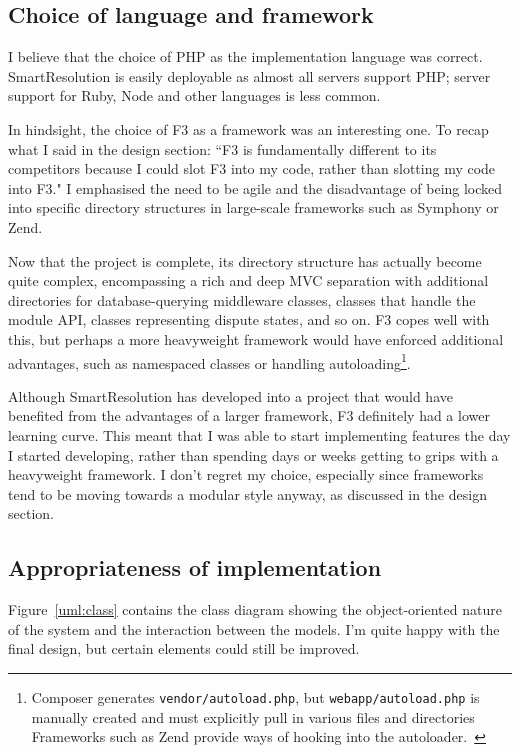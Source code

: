\subsection{Choice of language and framework}

I believe that the choice of PHP as the implementation language was correct. SmartResolution is easily deployable as almost all servers support PHP; server support for Ruby, Node and other languages is less common.

In hindsight, the choice of F3 as a framework was an interesting one. To recap what I said in the design section: ``F3 is fundamentally different to its competitors because I could slot F3 into my code, rather than slotting my code into F3." I emphasised the need to be agile and the disadvantage of being locked into specific directory structures in large-scale frameworks such as Symphony or Zend.

Now that the project is complete, its directory structure has actually become quite complex, encompassing a rich and deep MVC separation with additional directories for database-querying middleware classes, classes that handle the module API, classes representing dispute states, and so on. F3 copes well with this, but perhaps a more heavyweight framework would have enforced additional advantages, such as namespaced classes or handling autoloading\footnote{Composer generates \lstinline{vendor/autoload.php}, but \lstinline{webapp/autoload.php} is manually created and must explicitly pull in various files and directories Frameworks such as Zend provide ways of hooking into the autoloader.~\cite{zend:autoload}}.

Although SmartResolution has developed into a project that would have benefited from the advantages of a larger framework, F3 definitely had a lower learning curve. This meant that I was able to start implementing features the day I started developing, rather than spending days or weeks getting to grips with a heavyweight framework. I don't regret my choice, especially since frameworks tend to be moving towards a modular style anyway, as discussed in the design section.

\subsection{Appropriateness of implementation}

Figure~\ref{uml:class} contains the class diagram showing the object-oriented nature of the system and the interaction between the models. I'm quite happy with the final design, but certain elements could still be improved.

